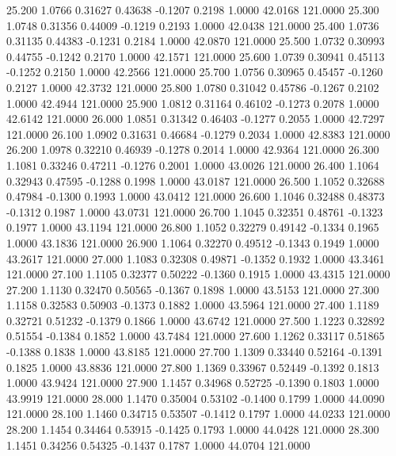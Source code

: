   25.200   1.0766   0.31627   0.43638  -0.1207   0.2198   1.0000  42.0168 121.0000
  25.300   1.0748   0.31356   0.44009  -0.1219   0.2193   1.0000  42.0438 121.0000
  25.400   1.0736   0.31135   0.44383  -0.1231   0.2184   1.0000  42.0870 121.0000
  25.500   1.0732   0.30993   0.44755  -0.1242   0.2170   1.0000  42.1571 121.0000
  25.600   1.0739   0.30941   0.45113  -0.1252   0.2150   1.0000  42.2566 121.0000
  25.700   1.0756   0.30965   0.45457  -0.1260   0.2127   1.0000  42.3732 121.0000
  25.800   1.0780   0.31042   0.45786  -0.1267   0.2102   1.0000  42.4944 121.0000
  25.900   1.0812   0.31164   0.46102  -0.1273   0.2078   1.0000  42.6142 121.0000
  26.000   1.0851   0.31342   0.46403  -0.1277   0.2055   1.0000  42.7297 121.0000
  26.100   1.0902   0.31631   0.46684  -0.1279   0.2034   1.0000  42.8383 121.0000
  26.200   1.0978   0.32210   0.46939  -0.1278   0.2014   1.0000  42.9364 121.0000
  26.300   1.1081   0.33246   0.47211  -0.1276   0.2001   1.0000  43.0026 121.0000
  26.400   1.1064   0.32943   0.47595  -0.1288   0.1998   1.0000  43.0187 121.0000
  26.500   1.1052   0.32688   0.47984  -0.1300   0.1993   1.0000  43.0412 121.0000
  26.600   1.1046   0.32488   0.48373  -0.1312   0.1987   1.0000  43.0731 121.0000
  26.700   1.1045   0.32351   0.48761  -0.1323   0.1977   1.0000  43.1194 121.0000
  26.800   1.1052   0.32279   0.49142  -0.1334   0.1965   1.0000  43.1836 121.0000
  26.900   1.1064   0.32270   0.49512  -0.1343   0.1949   1.0000  43.2617 121.0000
  27.000   1.1083   0.32308   0.49871  -0.1352   0.1932   1.0000  43.3461 121.0000
  27.100   1.1105   0.32377   0.50222  -0.1360   0.1915   1.0000  43.4315 121.0000
  27.200   1.1130   0.32470   0.50565  -0.1367   0.1898   1.0000  43.5153 121.0000
  27.300   1.1158   0.32583   0.50903  -0.1373   0.1882   1.0000  43.5964 121.0000
  27.400   1.1189   0.32721   0.51232  -0.1379   0.1866   1.0000  43.6742 121.0000
  27.500   1.1223   0.32892   0.51554  -0.1384   0.1852   1.0000  43.7484 121.0000
  27.600   1.1262   0.33117   0.51865  -0.1388   0.1838   1.0000  43.8185 121.0000
  27.700   1.1309   0.33440   0.52164  -0.1391   0.1825   1.0000  43.8836 121.0000
  27.800   1.1369   0.33967   0.52449  -0.1392   0.1813   1.0000  43.9424 121.0000
  27.900   1.1457   0.34968   0.52725  -0.1390   0.1803   1.0000  43.9919 121.0000
  28.000   1.1470   0.35004   0.53102  -0.1400   0.1799   1.0000  44.0090 121.0000
  28.100   1.1460   0.34715   0.53507  -0.1412   0.1797   1.0000  44.0233 121.0000
  28.200   1.1454   0.34464   0.53915  -0.1425   0.1793   1.0000  44.0428 121.0000
  28.300   1.1451   0.34256   0.54325  -0.1437   0.1787   1.0000  44.0704 121.0000
